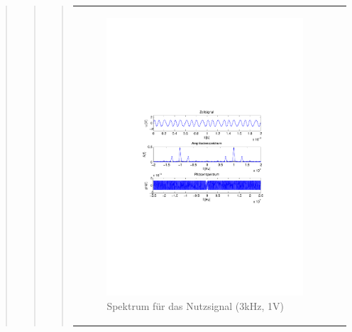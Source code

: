 \begin{quote}
\begin{quote}
\begin{quote}
\begin{center}
\begin{tabular}{ll}
\begin{minipage}{0.6\textwidth}
                    \begin{figure}[H]
                        \label{fig:}
                        \includegraphics[scale=0.5, trim = 2cm 6.5cm 1.5cm
                        8.5cm, clip]{./Bilder/spektrum_sin3kHz}
                        \caption{Spektrum für das Nutzsignal (3kHz, 1V)}
                    \end{figure}

                \end{minipage}
                \begin{minipage}{0.6\textwidth}


\end{minipage}
\end{tabular}
\end{center}
\end{quote}
\end{quote}
\end{quote}
